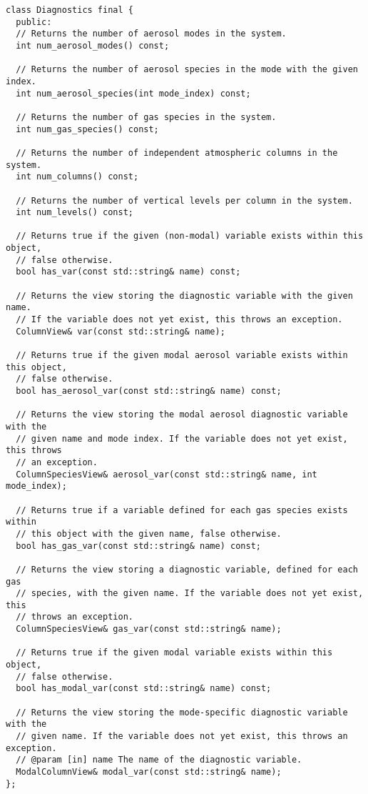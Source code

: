 \begin{verbatim}
class Diagnostics final {
  public:
  // Returns the number of aerosol modes in the system.
  int num_aerosol_modes() const;

  // Returns the number of aerosol species in the mode with the given index.
  int num_aerosol_species(int mode_index) const;

  // Returns the number of gas species in the system.
  int num_gas_species() const;

  // Returns the number of independent atmospheric columns in the system.
  int num_columns() const;

  // Returns the number of vertical levels per column in the system.
  int num_levels() const;

  // Returns true if the given (non-modal) variable exists within this object,
  // false otherwise.
  bool has_var(const std::string& name) const;

  // Returns the view storing the diagnostic variable with the given name.
  // If the variable does not yet exist, this throws an exception.
  ColumnView& var(const std::string& name);

  // Returns true if the given modal aerosol variable exists within this object,
  // false otherwise.
  bool has_aerosol_var(const std::string& name) const;

  // Returns the view storing the modal aerosol diagnostic variable with the
  // given name and mode index. If the variable does not yet exist, this throws
  // an exception.
  ColumnSpeciesView& aerosol_var(const std::string& name, int mode_index);

  // Returns true if a variable defined for each gas species exists within
  // this object with the given name, false otherwise.
  bool has_gas_var(const std::string& name) const;

  // Returns the view storing a diagnostic variable, defined for each gas
  // species, with the given name. If the variable does not yet exist, this
  // throws an exception.
  ColumnSpeciesView& gas_var(const std::string& name);

  // Returns true if the given modal variable exists within this object,
  // false otherwise.
  bool has_modal_var(const std::string& name) const;

  // Returns the view storing the mode-specific diagnostic variable with the
  // given name. If the variable does not yet exist, this throws an exception.
  // @param [in] name The name of the diagnostic variable.
  ModalColumnView& modal_var(const std::string& name);
};
\end{verbatim}

